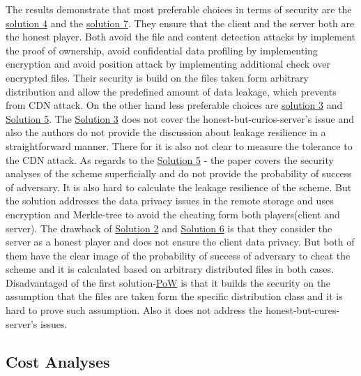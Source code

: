 \documentclass[12pt]{article}
\begin{document}
The results demonstrate that most preferable choices in terms of security are the \hyperref[sub:Soltuion4]{solution 4} and the \hyperref[sub:Soltuion7]{solution 7}. They ensure that the client and the server both are the honest player. Both avoid the file and content detection attacks by implement the proof of ownership, avoid confidential data profiling by implementing  encryption and avoid position attack by implementing additional check over encrypted files. Their security is build on the files taken form arbitrary distribution and allow the predefined amount of data leakage, which prevents from CDN attack. On the other hand less preferable choices are  \hyperref[sub:Soltuion3]{solution 3} and \hyperref[sub:Soltuion5]{Solution 5}. The \hyperref[sub:Soltuion3]{Solution 3}  does not cover the honest-but-curios-server's issue and also the authors do not provide the discussion about leakage resilience in a straightforward manner. There for it is also not clear to measure the tolerance to the CDN attack. As regards to the \hyperref[sub:Soltuion5]{Solution 5} - the paper covers the security analyses of the scheme  superficially and do not provide the probability of success of adversary. It is also hard to calculate the leakage resilience of the scheme. But the solution  addresses the  data privacy issues in the remote storage and uses encryption and Merkle-tree to avoid the cheating form both players(client and server). The drawback of \hyperref[sub:Soltuion2]{Solution 2} and \hyperref[sub:Soltuion6]{Solution 6} is that they consider the server as a honest player and does not ensure the client data privacy. But both of them have the clear image of the probability of success of adversary to cheat the scheme and it is calculated based on arbitrary distributed files in both cases. Disadvantaged of the first solution-\hyperref[sub:Soltuion1] {PoW} is that it builds the security on the assumption that the files are taken form the specific distribution class and it is hard to prove such assumption. Also it does not address the honest-but-cures-server's issues.


\subsection{Cost Analyses}
\label{sub:Cost}
\end{document}
